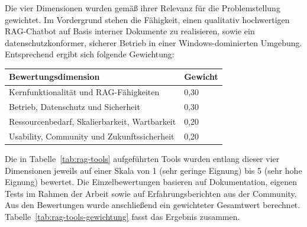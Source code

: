 Die vier Dimensionen wurden gemäß ihrer Relevanz für die Problemstellung gewichtet.
Im Vordergrund stehen die Fähigkeit, einen qualitativ hochwertigen RAG-Chatbot auf Basis interner Dokumente zu realisieren, sowie ein datenschutzkonformer, sicherer Betrieb in einer Windows-dominierten Umgebung.
Entsprechend ergibt sich folgende Gewichtung:
\vspace{1cm}
\FloatBarrier
\begin{center}
    \begin{tabular}{ll}
        \toprule
        \textbf{Bewertungsdimension} & \textbf{Gewicht} \\
        \midrule
        Kernfunktionalität und RAG-Fähigkeiten          & 0{,}30 \\
        Betrieb, Datenschutz und Sicherheit             & 0{,}30 \\
        Ressourcenbedarf, Skalierbarkeit, Wartbarkeit   & 0{,}20 \\
        Usability, Community und Zukunftssicherheit     & 0{,}20 \\
        \bottomrule
    \end{tabular}
\end{center}
\vspace{1cm}
\FloatBarrier
Die in Tabelle~\ref{tab:rag-tools} aufgeführten Tools wurden entlang dieser vier Dimensionen jeweils auf einer Skala von 1 (sehr geringe Eignung) bis 5 (sehr hohe Eignung) bewertet.
Die Einzelbewertungen basieren auf Dokumentation, eigenen Tests im Rahmen der Arbeit sowie auf Erfahrungsberichten aus der Community.
Aus den Bewertungen wurde anschließend ein gewichteter Gesamtwert berechnet.
Tabelle~\ref{tab:rag-tools-gewichtung} fasst das Ergebnis zusammen.
\vspace{1cm}
\FloatBarrier
